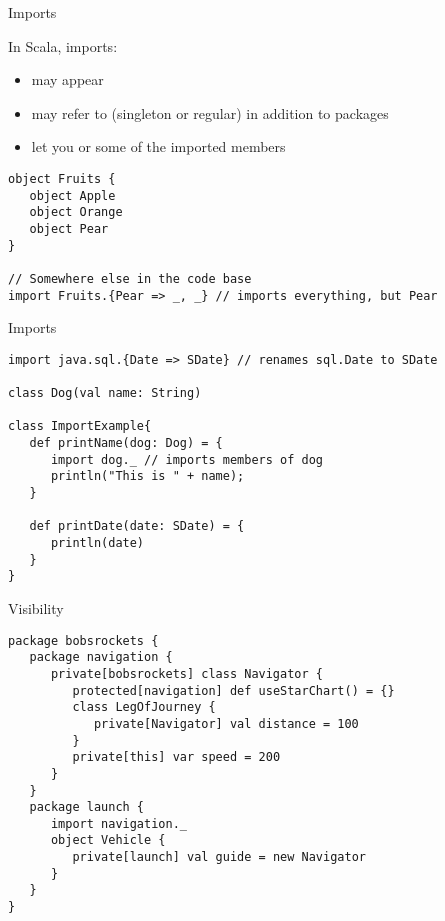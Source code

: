 \begin{frame}[fragile]{Imports}
\begin{block}{In Scala, imports:}
\begin{itemize}
  \item may appear 
  \item may refer to  (singleton or regular) in addition to
  packages
  \item let you  or  some of the imported
  members
\end{itemize}
\end{block}
\pause
\begin{lstlisting}
object Fruits {
   object Apple
   object Orange
   object Pear
}

// Somewhere else in the code base
import Fruits.{Pear => _, _} // imports everything, but Pear
\end{lstlisting}
\end{frame}

\begin{frame}[fragile]{Imports}
\begin{lstlisting}
import java.sql.{Date => SDate} // renames sql.Date to SDate

class Dog(val name: String)

class ImportExample{
   def printName(dog: Dog) = {
      import dog._ // imports members of dog
      println("This is " + name);
   }
   
   def printDate(date: SDate) = {
      println(date)
   }
}
\end{lstlisting}
\end{frame}

\begin{frame}[fragile]{Visibility}
\begin{lstlisting}
package bobsrockets {
   package navigation {
      private[bobsrockets] class Navigator {
         protected[navigation] def useStarChart() = {}
         class LegOfJourney {
            private[Navigator] val distance = 100
         }
         private[this] var speed = 200
      }
   }
   package launch {
      import navigation._
      object Vehicle {
         private[launch] val guide = new Navigator
      }
   }
}
\end{lstlisting}
\end{frame}

